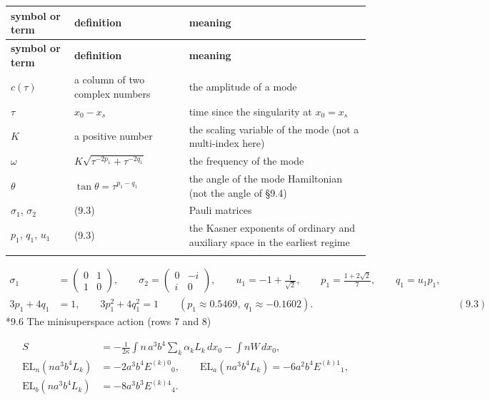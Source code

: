 \documentclass[10pt,a4paper]{article}
\makeatletter
\renewcommand\subsection{\@startsection{subsection}{2}{\z@}{-3.25ex\@plus -1ex \@minus -.2ex}{1.5ex \@plus .2ex}{\normalfont\large\bfseries\raggedright}}
\makeatother
\begin{document}
{\footnotesize
\begin{longtable}{>{\raggedright\arraybackslash}p{}>{\raggedright\arraybackslash}p{}>{\raggedright\arraybackslash}p{}}
\toprule
\textbf{symbol or term} & \textbf{definition} & \textbf{meaning} \\
\midrule\endfirsthead
\toprule
\textbf{symbol or term} & \textbf{definition} & \textbf{meaning} \\
\midrule\endhead
\endfoot
\bottomrule\endlastfoot
$c(\tau)$ & a column of two complex numbers & the amplitude of a mode \\
$\tau$ & $x_0-x_s$ & time since the singularity at $x_0=x_s$ \\
$K$ & a positive number & the scaling variable of the mode (not a multi-index here) \\
$\omega$ & $K\sqrt{\tau^{-2p_1}+\tau^{-2q_1}}$ & the frequency of the mode \\
$\theta$ & $\tan\theta=\tau^{p_1-q_1}$ & the angle of the mode Hamiltonian (not the angle of §9.4) \\
$\sigma_1$, $\sigma_2$ & (9.3) & Pauli matrices \\
$p_1$, $q_1$, $u_1$ & (9.3) & the Kasner exponents of ordinary and auxiliary space in the earliest regime \\*
\end{longtable}}
\begin{align*}
\sigma_1&=\begin{pmatrix}0&1\\1&0\end{pmatrix},\qquad \sigma_2=\begin{pmatrix}0&-i\\i&0\end{pmatrix},\qquad u_1=-1+\frac1{\sqrt2},\qquad p_1=\frac{1+2\sqrt2}7,\qquad q_1=u_1p_1, \\
3p_1+4q_1&=1,\qquad 3p_1^2+4q_1^2=1\qquad(p_1\approx0.5469,\ q_1\approx-0.1602).&&(9.3)
\end{align*}
\subsection*{9.6 The minisuperspace action (rows 7 and 8)}
\begin{align*}
S&=-\frac1{2\kappa}\int n\,a^3b^4\sum_k\alpha_kL_k\,dx_0-\int nW\,dx_0, \\
\mathrm{EL}_n(na^3b^4L_k)&=-2a^3b^4E^{(k)0}{}_0,\qquad \mathrm{EL}_a(na^3b^4L_k)=-6a^2b^4E^{(k)1}{}_1, \\
\mathrm{EL}_b(na^3b^4L_k)&=-8a^3b^3E^{(k)4}{}_4 .
\end{align*}
\end{document}
